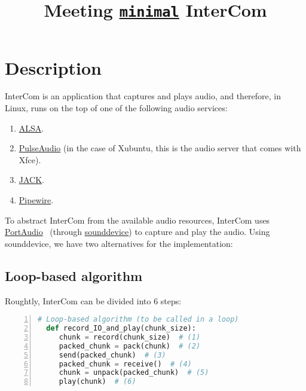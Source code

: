 
\title{Meeting \href{https://github.com/Tecnologias-multimedia/InterCom/blob/master/src/minimal.py}{\texttt{minimal}} InterCom}

\maketitle

\section{Description}

InterCom is an application that captures and plays audio, and therefore, in Linux, runs on the top of one of the following audio services:
\begin{enumerate}
\item \href{https://vicente-gonzalez-ruiz.github.io/ALSA/}{ALSA}.
\item
  \href{https://vicente-gonzalez-ruiz.github.io/PulseAudio/}{PulseAudio}
  (in the case of Xubuntu, this is the audio server that comes with
  Xfce).
\item \href{https://vicente-gonzalez-ruiz.github.io/JACK/}{JACK}.
\item \href{https://pipewire.org/}{Pipewire}.
\end{enumerate}

To abstract InterCom from the available audio resources, InterCom uses
\href{http://www.portaudio.com/}{PortAudio}~\cite{portaudio} (through
\href{https://vicente-gonzalez-ruiz.github.io/intro_to_sounddevice/}{sounddevice})
to capture and play the audio. Using sounddevice, we have two
alternatives for the implementation:

\subsection{Loop-based algorithm}

Roughtly, InterCom can be divided into 6 steps:

\begin{lstlisting}[language=Python,numbers=left]
  # Loop-based algorithm (to be called in a loop)
  def record_IO_and_play(chunk_size):
     chunk = record(chunk_size)  # (1)
     packed_chunk = pack(chunk)  # (2)
     send(packed_chunk)  # (3)
     packed_chunk = receive()  # (4)
     chunk = unpack(packed_chunk)  # (5)
     play(chunk)  # (6)
\end{lstlisting}


